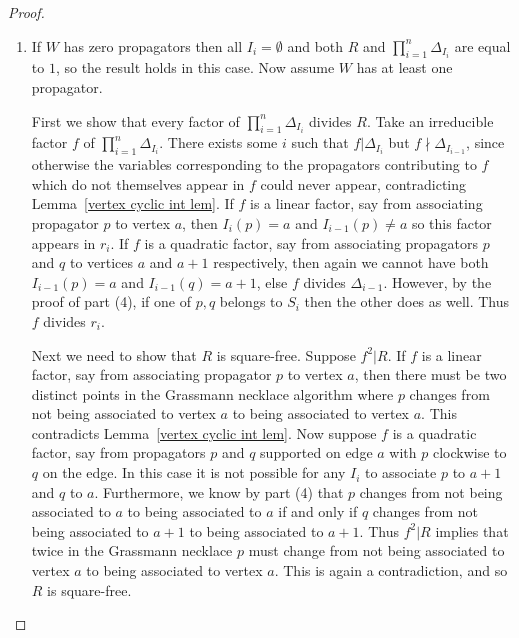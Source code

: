 \documentclass[11pt]{article}
\newcommand{\note}{\todo[color=green!40]}
\theoremstyle{remark}
\theoremstyle{definition}
\begin{document}
\begin{proof}
\begin{enumerate}

\item If $W$ has zero propagators then all $I_i=\emptyset$ and both $R$ and $\prod_{i=1}^n \Delta_{I_i}$ are equal to $1$, so the result holds in this case.  Now assume $W$ has at least one propagator.

First we show that every factor of $\prod_{i=1}^n \Delta_{I_i}$ divides $R$.  Take an irreducible factor $f$ of $\prod_{i=1}^n \Delta_{I_i}$. There exists some $i$ such that $f|\Delta_{I_i}$ but $f\!\!\nmid\!\! \Delta_{I_{i-1}}$, since otherwise the variables corresponding to the propagators contributing to $f$ which do not themselves appear in $f$ could never appear, contradicting Lemma~\ref{vertex cyclic int lem}.  If $f$ is a linear factor, say from associating propagator $p$ to vertex $a$, then $I_{i}(p)=a$ and $I_{i-1}(p)\neq a$ so this factor appears in $r_i$.  If $f$ is a quadratic factor, say from associating propagators $p$ and $q$ to vertices $a$ and $a+1$ respectively, then again we cannot have both $I_{i-1}(p) = a$ and $I_{i-1}(q) = a+1$, else $f$ divides $\Delta_{i-1}$. However, by the proof of part (4), if one of $p,q$ belongs to $S_i$ then the other does as well.  Thus $f$ divides $r_i$.

Next we need to show that $R$ is square-free.  Suppose $f^2|R$.  If $f$ is a linear factor, say from associating propagator $p$ to vertex $a$, then there must be two distinct points in the Grassmann necklace algorithm where $p$ changes from not being associated to vertex $a$ to being associated to vertex $a$.  This contradicts Lemma~\ref{vertex cyclic int lem}.  Now suppose $f$ is a quadratic factor, say from propagators $p$ and $q$ supported on edge $a$ with $p$ clockwise to $q$ on the edge.  In this case it is not possible for any $I_i$ to associate $p$ to $a+1$ and $q$ to $a$.  Furthermore, we know by part (4) that $p$ changes from not being associated to $a$ to being associated to $a$ if and only if $q$ changes from not being associated to $a+1$ to being associated to $a+1$.  Thus $f^2|R$ implies that twice in the Grassmann necklace $p$ must change from not being associated to vertex $a$ to being associated to vertex $a$. This is again a contradiction, and so $R$ is square-free.


\end{enumerate}
\end{proof}
\end{document}
